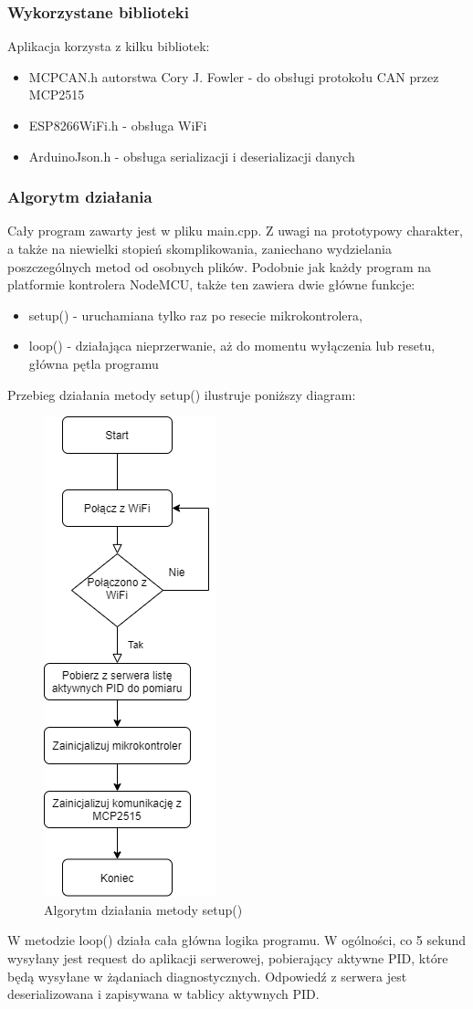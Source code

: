 \documentclass[10pt,a4paper]{scrartcl}
\begin{document}
		\subsubsection {Wykorzystane biblioteki}
		Aplikacja korzysta z kilku bibliotek:
		\begin{itemize}
			\item MCPCAN.h autorstwa Cory J. Fowler - do obsługi protokołu CAN przez MCP2515
			\item ESP8266WiFi.h - obsługa WiFi
			\item ArduinoJson.h - obsługa serializacji i deserializacji danych
		\end{itemize}
		\subsubsection{Algorytm działania}
		Cały program zawarty jest w pliku main.cpp. Z uwagi na prototypowy charakter, a także na niewielki stopień skomplikowania, zaniechano wydzielania poszczególnych metod od osobnych plików. Podobnie jak każdy program na platformie kontrolera NodeMCU, także ten zawiera dwie główne funkcje:
		\begin{itemize}
			\item setup() - uruchamiana tylko raz po resecie mikrokontrolera,
			\item loop() - działająca nieprzerwanie, aż do momentu wyłączenia lub resetu, główna pętla programu
		\end{itemize}
		Przebieg działania metody setup() ilustruje poniższy diagram:
		\begin{figure}[H]
			\centering
			\includegraphics[width=0.2\linewidth]{loop_algorymt}
			\caption[setup()- algorytm działania]{Algorytm działania metody setup()}
			\label{fig:loopalgorymt}
		\end{figure}
		W metodzie loop() działa cała główna logika programu. W ogólności, co 5 sekund wysyłany jest request do aplikacji serwerowej, pobierający aktywne PID, które będą wysyłane w żądaniach diagnostycznych. Odpowiedź z serwera jest deserializowana i zapisywana w tablicy aktywnych PID.
\end{document}
